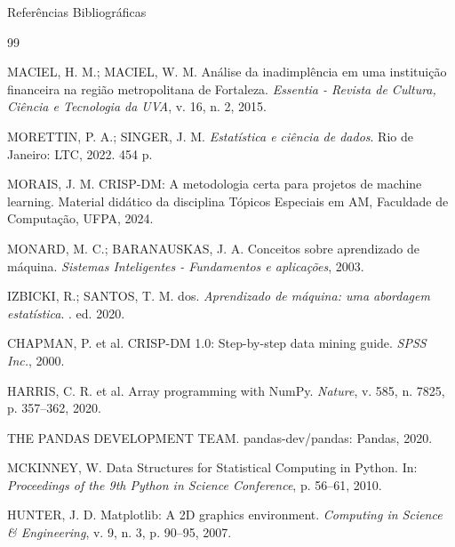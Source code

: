\documentclass[aspectratio=169]{beamer}
\begin{document}
\begin{frame}[allowframebreaks]{Referências Bibliográficas}
    \scriptsize %
    \begin{thebibliography}{99}

    MACIEL, H. M.; MACIEL, W. M. 
    \newblock Análise da inadimplência em uma instituição financeira na região metropolitana de Fortaleza.
    \newblock \emph{Essentia - Revista de Cultura, Ciência e Tecnologia da UVA}, v. 16, n. 2, 2015.

    MORETTIN, P. A.; SINGER, J. M.
    \newblock \emph{Estatística e ciência de dados}.
    \newblock Rio de Janeiro: LTC, 2022. 454 p.

    MORAIS, J. M.
    \newblock CRISP-DM: A metodologia certa para projetos de machine learning.
    \newblock Material didático da disciplina Tópicos Especiais em AM, Faculdade de Computação, UFPA, 2024.

    MONARD, M. C.; BARANAUSKAS, J. A.
    \newblock Conceitos sobre aprendizado de máquina.
    \newblock \emph{Sistemas Inteligentes - Fundamentos e aplicações}, 2003.

    IZBICKI, R.; SANTOS, T. M. dos.
    \newblock \emph{Aprendizado de máquina: uma abordagem estatística}.
    . ed. 2020.

    CHAPMAN, P. et al.
    \newblock CRISP-DM 1.0: Step-by-step data mining guide.
    \newblock \emph{SPSS Inc.}, 2000.

    HARRIS, C. R. et al.
    \newblock Array programming with NumPy.
    \newblock \emph{Nature}, v. 585, n. 7825, p. 357–362, 2020.

    THE PANDAS DEVELOPMENT TEAM.
    \newblock pandas-dev/pandas: Pandas, 2020.

    MCKINNEY, W.
    \newblock Data Structures for Statistical Computing in Python.
    \newblock In: \emph{Proceedings of the 9th Python in Science Conference}, p. 56–61, 2010.

    HUNTER, J. D.
    \newblock Matplotlib: A 2D graphics environment.
    \newblock \emph{Computing in Science \& Engineering}, v. 9, n. 3, p. 90–95, 2007.


\end{thebibliography}
\end{frame}
\end{document}

